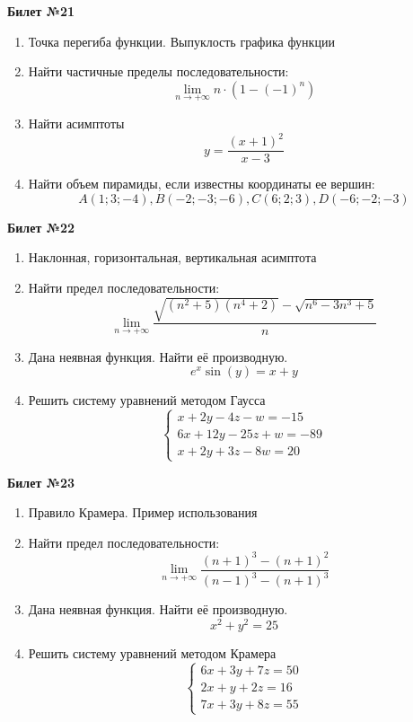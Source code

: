 \documentclass[a4paper, 12pt]{article}
\begin{document}
\begin{center}
    \textbf{Билет №21}
\end{center}
\begin{enumerate}
\item Точка перегиба функции. Выпуклость графика функции
\item Найти частичные пределы последовательности: \[\lim \limits_{n \to +\infty} n \cdot (1 - (-1)^n)\]
\item Найти асимптоты
\[y = \frac{(x+1)^2}{x - 3}\]
\item Найти объем пирамиды, если известны координаты ее вершин:
\[A(1;3;-4), B(-2;-3;-6), C(6;2;3), D(-6;-2;-3)\]
\end{enumerate}

\newpage
\begin{center}
    \textbf{Билет №22}
\end{center}
\begin{enumerate}
\item Наклонная, горизонтальная, вертикальная асимптота 
\item Найти предел последовательности:  
\[\lim \limits_{n \to +\infty} \frac{\sqrt{(n^2 + 5)(n^4 + 2)} - \sqrt{n^6 - 3n^3 +5}}{n}\]
\item Дана неявная функция. Найти её производную.
\[
e^x \sin(y) = x + y
\]
\item Решить систему уравнений методом Гаусса
\[
	\begin{cases}
		x + 2y - 4z - w = -15 \\
		6x + 12y - 25z + w = -89 \\
		x + 2y + 3z - 8w = 20
	\end{cases}
\]
\end{enumerate}

\begin{center}
    \textbf{Билет №23}
\end{center}
\begin{enumerate}
\item Правило Крамера. Пример использования
\item Найти предел последовательности:  
\[\lim \limits_{n \to +\infty} \frac{(n+1)^3 - (n+1)^2}{(n-1)^3 - (n+1)^3}\]
\item Дана неявная функция. Найти её производную.
\[
x^2 + y^2 = 25
\]
\item Решить систему уравнений методом Крамера
\[
	\begin{cases}
		6x + 3y + 7z = 50 \\
		2x + y + 2z = 16 \\
		7x + 3y + 8z = 55
	\end{cases}
\]
\end{enumerate}
\end{document}
